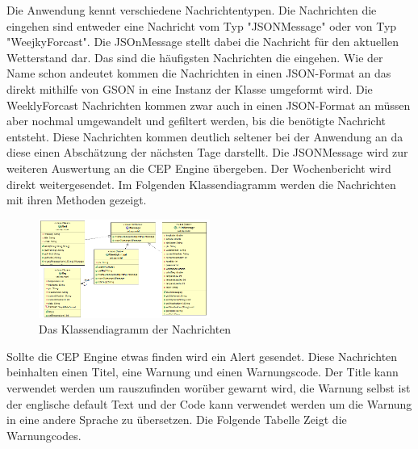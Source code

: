 Die Anwendung kennt verschiedene Nachrichtentypen. Die Nachrichten die eingehen sind entweder eine Nachricht vom Typ "JSONMessage" oder von Typ "WeejkyForcast". Die JSOnMessage stellt dabei die Nachricht für den aktuellen Wetterstand dar. Das sind die häufigsten Nachrichten die eingehen. Wie der Name schon andeutet kommen die Nachrichten in einen JSON-Format an das direkt mithilfe von GSON in eine Instanz der Klasse umgeformt wird. Die WeeklyForcast Nachrichten kommen zwar auch in einen JSON-Format an müssen aber nochmal umgewandelt und gefiltert werden, bis die benötigte Nachricht entsteht. Diese Nachrichten kommen deutlich seltener bei der Anwendung an da diese einen Abschätzung der nächsten Tage darstellt. Die JSONMessage wird zur weiteren Auswertung an die CEP Engine übergeben. Der Wochenbericht wird direkt weitergesendet. Im Folgenden Klassendiagramm werden die Nachrichten mit ihren Methoden gezeigt. 
\begin{figure}[htbp]
	\centering
	\includegraphics[width=0.5\textwidth]{Bilder/News.png}
	\caption{Das Klassendiagramm der Nachrichten}
	\label{img:eventDiagramm}
\end{figure} 
Sollte die CEP Engine etwas finden wird ein Alert gesendet. Diese Nachrichten beinhalten einen Titel, eine Warnung und einen Warnungscode. Der Title kann verwendet werden um rauszufinden worüber gewarnt wird, die Warnung selbst ist der englische default Text und der Code kann verwendet werden um die Warnung in eine andere Sprache zu übersetzen.  Die Folgende Tabelle Zeigt die Warnungcodes. 
